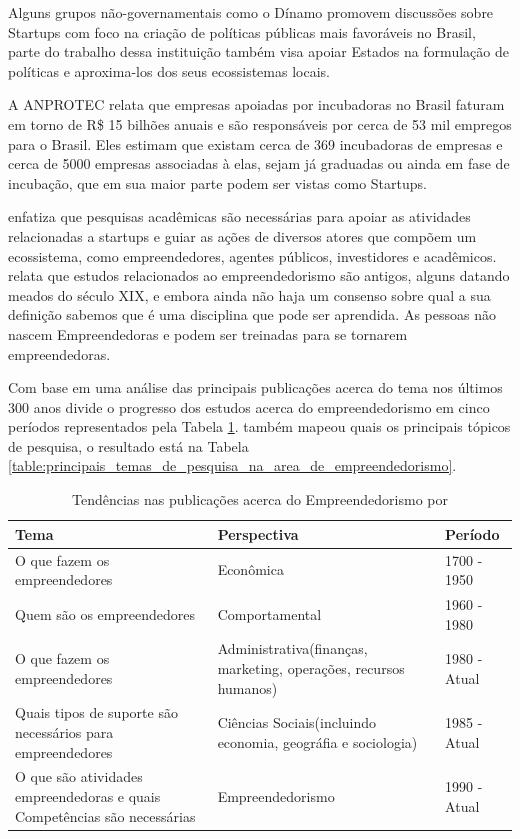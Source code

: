 Alguns grupos não-governamentais como o Dínamo promovem discussões sobre Startups com foco na criação de políticas públicas mais favoráveis no Brasil, parte do trabalho dessa instituição também visa apoiar Estados na formulação de políticas e aproxima-los dos seus ecossistemas locais. 

A ANPROTEC relata que empresas apoiadas por incubadoras no Brasil faturam em torno de R\$ 15 bilhões anuais e são responsáveis por cerca de 53 mil empregos para o Brasil. Eles estimam que existam cerca de 369 incubadoras de empresas e cerca de 5000 empresas associadas à elas, sejam já graduadas ou ainda em fase de incubação, que em sua maior parte podem ser vistas como Startups. 

 enfatiza que pesquisas acadêmicas são necessárias para apoiar as atividades relacionadas a startups e guiar as ações de diversos atores que compõem um ecossistema, como empreendedores, agentes públicos, investidores e acadêmicos.  relata que estudos relacionados ao empreendedorismo são antigos, alguns datando meados do século XIX, e embora ainda não haja um consenso sobre qual a sua definição sabemos que é uma disciplina que pode ser aprendida. As pessoas não nascem Empreendedoras e podem ser treinadas para se tornarem empreendedoras. 

Com base em uma análise das principais publicações acerca do tema nos últimos 300 anos  divide o progresso dos estudos acerca do empreendedorismo em cinco períodos representados pela Tabela \ref{table:tendencias_nas_publicacoes_acerca_do_empreendedorismo}.  também mapeou quais os principais tópicos de pesquisa, o resultado está na Tabela \ref{table:principais_temas_de_pesquisa_na_area_de_empreendedorismo}.

\begin{table}[!htb]
	\centering
	\begin{tabular}{ | p{6cm} | p{6cm} | p{3cm} | }
		\hline
		Tema & Perspectiva & Período \\ \hline
		O que fazem os empreendedores & Econômica & 1700 - 1950 \\ \hline
		Quem são os empreendedores & Comportamental & 1960 - 1980 \\ \hline
		O que fazem os empreendedores & Administrativa(finanças, marketing, operações, recursos humanos) & 1980 - Atual \\ \hline
		Quais tipos de suporte são necessários para empreendedores & Ciências Sociais(incluindo economia, geográfia e sociologia) & 1985 - Atual \\ \hline
		O que são atividades empreendedoras e quais Competências são necessárias & Empreendedorismo & 1990 - Atual \\ \hline
	\end{tabular}
	\caption{Tendências nas publicações acerca do Empreendedorismo por \cite{Filion1998}}	
	\label{table:tendencias_nas_publicacoes_acerca_do_empreendedorismo}
\end{table}

